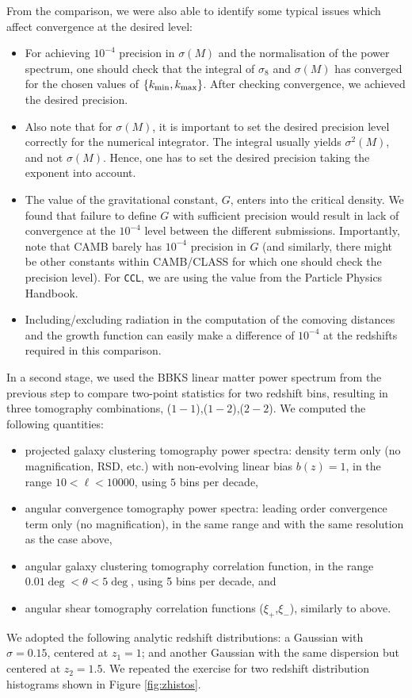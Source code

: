 \documentclass[\docopts]{\docclass}
\newcommand{\ccl}{{\tt CCL}\xspace}
\begin{document}
From the comparison, we were also able to identify some typical issues which affect convergence at the desired level:
\begin{itemize}
\item For achieving $10^{-4}$ precision in $\sigma(M)$ and the normalisation of the power spectrum, one should check that the integral of $\sigma_8$ and $\sigma(M)$ has converged for the chosen values of $\{k_{\rm min},k_{\rm max}\}$. After checking convergence, we achieved the desired precision.
\item Also note that for $\sigma(M)$, it is important to set the desired precision level correctly for the numerical integrator. The integral usually yields $\sigma^2(M)$, and not $\sigma(M)$. Hence, one has to set the desired precision taking the exponent into account.
\item The value of the gravitational constant, $G$, enters into the critical density. We found that failure to define $G$ with sufficient precision would result in lack of convergence at the $10^{-4}$ level between the different submissions. Importantly, note that CAMB barely has $10^{-4}$ precision in $G$ (and similarly, there might be other constants within CAMB/CLASS for which one should check the precision level). For \ccl, we are using the value from the Particle Physics Handbook.
\item Including/excluding radiation in the computation of the comoving distances and the growth function can easily make a difference of $10^{-4}$ at the redshifts required in this comparison.
\end{itemize}

In a second stage, we used the BBKS linear matter power spectrum from the previous step to compare two-point statistics for two redshift bins, resulting in three tomography combinations, ($1-1$),($1-2$),($2-2$). We computed the following quantities:
\begin{itemize}
\item projected galaxy clustering tomography power spectra: density term only (no magnification, RSD, etc.) with non-evolving linear bias $b(z) = 1$, in the range $10 < \ell < 10000$, using $5$ bins per decade,
\item angular convergence tomography power spectra: leading order convergence term only (no magnification), in the same range and with the same resolution as the case above,
\item angular galaxy clustering tomography correlation function, in the range $0.01 \deg < \theta < 5 \deg$, using 5 bins per decade, and
\item angular shear tomography correlation functions ($\xi_+$,$\xi_-$), similarly to above.
\end{itemize}
We adopted the following analytic redshift distributions: a Gaussian with $\sigma = 0.15$, centered at $z_1 = 1$; and another Gaussian with the same dispersion but centered at $z_2 = 1.5$. We repeated the exercise for two redshift distribution histograms shown in Figure \ref{fig:zhistos}.
\end{document}
